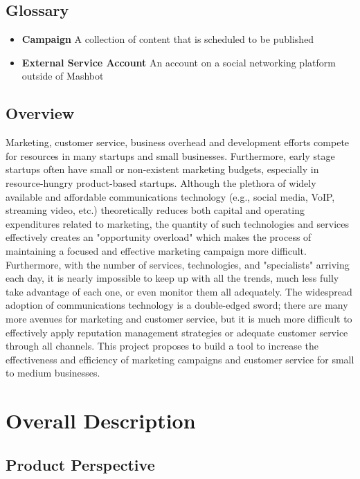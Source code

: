 \documentclass{article}
\begin{document}
\subsection{Glossary} %

\begin{itemize}

\item \textbf{Campaign} A collection of content that is scheduled to be
published
\item \textbf{External Service Account} An account on a social
  networking platform outside of Mashbot

\end{itemize}

\subsection{Overview} %

Marketing, customer service, business overhead and development efforts
compete for resources in many startups and small
businesses. Furthermore, early stage startups often have small or
non-existent marketing budgets, especially in resource-hungry
product-based startups. Although the plethora of widely available and
affordable communications technology (e.g., social media, VoIP,
streaming video, etc.) theoretically reduces both capital and
operating expenditures related to marketing, the quantity of such
technologies and services effectively creates an "opportunity
overload" which makes the process of maintaining a focused and
effective marketing campaign more difficult. Furthermore, with the
number of services, technologies, and "specialists" arriving each day,
it is nearly impossible to keep up with all the trends, much less
fully take advantage of each one, or even monitor them all
adequately. The widespread adoption of communications technology is a
double-edged sword; there are many more avenues for marketing and
customer service, but it is much more difficult to effectively apply
reputation management strategies or adequate customer service through
all channels. This project proposes to build a tool to increase the
effectiveness and efficiency of marketing campaigns and customer
service for small to medium businesses.

\section{Overall Description}
     \subsection{Product Perspective} %
\end{document}
